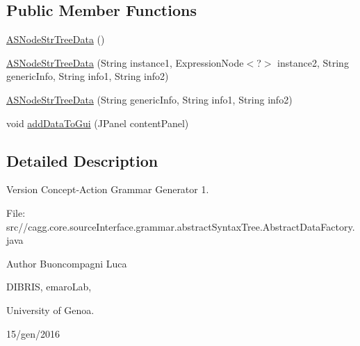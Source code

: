 \subsection*{Public Member Functions}
\begin{DoxyCompactItemize}
\item 
\hyperlink{classit_1_1emarolab_1_1cagg_1_1core_1_1language_1_1syntax_1_1abstractTree_1_1AbstractDataFactory_1_1ASNodeStrTreeData_a4bc573b9afc40235aaef26701c2a97f8}{A\-S\-Node\-Str\-Tree\-Data} ()
\item 
\hyperlink{classit_1_1emarolab_1_1cagg_1_1core_1_1language_1_1syntax_1_1abstractTree_1_1AbstractDataFactory_1_1ASNodeStrTreeData_af10d5248f256189cecef4d77bf83f7bf}{A\-S\-Node\-Str\-Tree\-Data} (String instance1, Expression\-Node$<$?$>$ instance2, String generic\-Info, String info1, String info2)
\item 
\hyperlink{classit_1_1emarolab_1_1cagg_1_1core_1_1language_1_1syntax_1_1abstractTree_1_1AbstractDataFactory_1_1ASNodeStrTreeData_a612fa562d0def472e2e521b180414e8b}{A\-S\-Node\-Str\-Tree\-Data} (String generic\-Info, String info1, String info2)
\item 
void \hyperlink{classit_1_1emarolab_1_1cagg_1_1core_1_1language_1_1syntax_1_1abstractTree_1_1AbstractDataFactory_1_1ASNodeStrTreeData_a021380c1901d184e588687dd1db48be6}{add\-Data\-To\-Gui} (J\-Panel content\-Panel)
\end{DoxyCompactItemize}


\subsection{Detailed Description}
\begin{DoxyVersion}{Version}
Concept-\/\-Action Grammar Generator 1. \par
 File\-: src//cagg.core.\-source\-Interface.\-grammar.\-abstract\-Syntax\-Tree.\-Abstract\-Data\-Factory.\-java \par

\end{DoxyVersion}
\begin{DoxyAuthor}{Author}
Buoncompagni Luca \par
 D\-I\-B\-R\-I\-S, emaro\-Lab,\par
 University of Genoa. \par
 15/gen/2016 \par

\end{DoxyAuthor}


